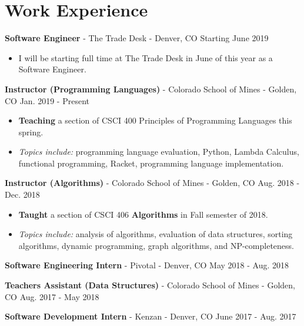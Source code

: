 \documentclass[10pt,letterpaper]{article}
\begin{document}
\section*{Work Experience}
\textbf{Software Engineer} - The Trade Desk - Denver, CO
\hfill Starting June 2019
\begin{itemize}
    \item I will be starting full time at The Trade Desk in June of this year as
        a Software Engineer.
\end{itemize}

\textbf{Instructor (Programming Languages)} - Colorado School of Mines - Golden, CO
\hfill Jan. 2019 - Present
\begin{itemize}
    \item \textbf{Teaching} a section of CSCI 400 Principles of Programming
        Languages this spring.
    \item \textit{Topics include:} programming language evaluation, Python,
        Lambda Calculus, functional programming, Racket, programming language
        implementation.
\end{itemize}

\textbf{Instructor (Algorithms)} - Colorado School of Mines - Golden, CO
\hfill Aug. 2018 - Dec. 2018
\begin{itemize}
    \item \textbf{Taught} a section of CSCI 406 \textbf{Algorithms} in Fall
        semester of 2018.
    \item \textit{Topics include:} analysis of algorithms, evaluation of data
        structures, sorting algorithms, dynamic programming, graph algorithms,
        and NP-completeness.
\end{itemize}

\textbf{Software Engineering Intern} - Pivotal - Denver, CO
\hfill May 2018 - Aug. 2018

\vspace{2pt}
\textbf{Teachers Assistant (Data Structures)} - Colorado School of Mines -
Golden, CO \hfill Aug. 2017 - May 2018

\vspace{2pt}
\textbf{Software Development Intern} - Kenzan - Denver, CO
\hfill June 2017 - Aug. 2017
\end{document}
